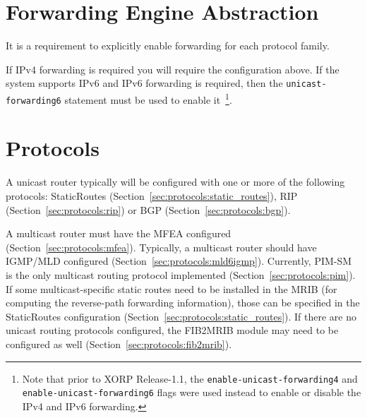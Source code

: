 \section{Forwarding Engine Abstraction}
\label{sec:fea}

It is a requirement to explicitly enable forwarding for each
protocol family.

\vspace{0.1in}
\noindent{}
\vspace{0.1in}

If IPv4 forwarding is required you will require the configuration
above. If the system supports IPv6 and IPv6 forwarding is required,
then the {\tt unicast-forwarding6} statement must be used to enable
it~\footnote{Note that prior to XORP Release-1.1, the
{\tt enable-unicast-forwarding4} and {\tt enable-unicast-forwarding6}
flags were used instead to enable or disable the IPv4 and IPv6 forwarding.}.

\newpage
\section{Protocols}
\label{sec:protocols}

A unicast router typically will be configured with one or more
of the following protocols:
StaticRoutes (Section~\ref{sec:protocols:static_routes}),
RIP (Section~\ref{sec:protocols:rip})
or BGP (Section~\ref{sec:protocols:bgp}).

A multicast router must have the MFEA configured
(Section~\ref{sec:protocols:mfea}). Typically, a multicast router should
have IGMP/MLD configured (Section~\ref{sec:protocols:mld6igmp}).
Currently, PIM-SM is the only multicast routing protocol implemented
(Section~\ref{sec:protocols:pim}). If some multicast-specific static
routes need to be installed in the MRIB (for computing the reverse-path
forwarding information), those can be specified in the StaticRoutes
configuration (Section~\ref{sec:protocols:static_routes}).
If there are no
unicast routing protocols configured, the FIB2MRIB module may
need to be configured as well (Section~\ref{sec:protocols:fib2mrib}).

